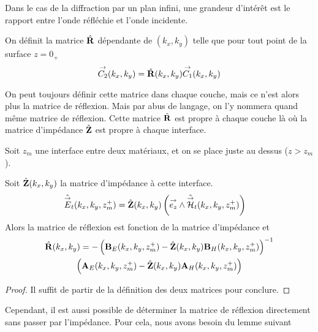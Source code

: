         Dans le cas de la diffraction par un plan infini, une grandeur d’intérêt est le rapport entre l'onde réfléchie et l'onde incidente.
         
        \begin{defn}
          On définit la matrice \(\hat{\mathbf{R}}\) dépendante de \((k_x,k_y)\) telle que pour tout point de la surface \(z=0_+\)
          \begin{equation}
            {\overset{\rightarrow}{C_2}}(k_x,k_y)  = \hat{\mathbf{R}}(k_x,k_y) {\overset{\rightarrow}{C_1}}(k_x,k_y)
          \end{equation}
        \end{defn}

        On peut toujours définir cette matrice dans chaque couche, mais ce n'est alors plus la matrice de réflexion. Mais par abus de langage, on l'y nommera quand même matrice de réflexion.
        Cette matrice \(\hat{\mathbf{R}}\) est propre à chaque couche là où la matrice d'impédance \(\hat{\mathbf{Z}}\) est propre à chaque interface.

        \begin{lemme}
            \label{lem:plan:reflexion_from_impedance}
            Soit \(z_m\) une interface entre deux matériaux, et on se place juste au dessus (\(z>z_m\)). 

            Soit \(\hat{\mathbf{Z}}(k_x,k_y)\) la matrice d'impédance à cette interface.
            \begin{align*}
                \hat{{\overset{\rightarrow}{E}}}_t(k_x,k_y,z_m^+) &= \hat{\mathbf{Z}}(k_x,k_y) \left({\overset{\rightarrow}{e_z}} \wedge \hat{{\overset{\rightarrow}{\mathcal{H}}}}_t(k_x,k_y,z_m^+)\right)
            \end{align*}
            Alors la matrice de réflexion est fonction de la matrice d'impédance et
            \begin{multline*}
                    \hat{\mathbf{R}}(k_x,k_y) = - \left(\mathbf{B}_E(k_x,k_y,z_m^+) - \hat{\mathbf{Z}}(k_x,k_y) \mathbf{B}_H(k_x,k_y,z_m^+) \right)^{-1}\\
                    \left(\mathbf{A}_E(k_x,k_y,z_m^+) - \hat{\mathbf{Z}}(k_x,k_y) \mathbf{A}_H(k_x,k_y,z_m^+) \right)
            \end{multline*}
        \end{lemme}
        \begin{proof}
            Il suffit de partir de la définition des deux matrices pour conclure.
        \end{proof}

        Cependant, il est aussi possible de déterminer la matrice de réflexion directement sans passer par l'impédance. Pour cela, nous avons besoin du lemme suivant

